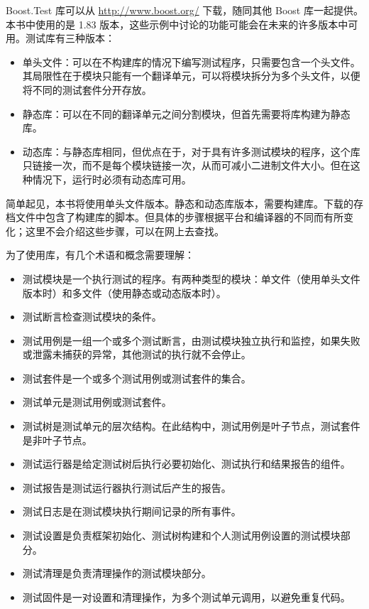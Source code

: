 
Boost.Test 库可以从 \url{http://www.boost.org/} 下载，随同其他 Boost 库一起提供。本书中使用的是 1.83 版本，这些示例中讨论的功能可能会在未来的许多版本中可用。测试库有三种版本：

\begin{itemize}
\item
单头文件：可以在不构建库的情况下编写测试程序，只需要包含一个头文件。其局限性在于模块只能有一个翻译单元，可以将模块拆分为多个头文件，以便将不同的测试套件分开存放。

\item
静态库：可以在不同的翻译单元之间分割模块，但首先需要将库构建为静态库。

\item
动态库：与静态库相同，但优点在于，对于具有许多测试模块的程序，这个库只链接一次，而不是每个模块链接一次，从而可减小二进制文件大小。但在这种情况下，运行时必须有动态库可用。
\end{itemize}

简单起见，本书将使用单头文件版本。静态和动态库版本，需要构建库。下载的存档文件中包含了构建库的脚本。但具体的步骤根据平台和编译器的不同而有所变化；这里不会介绍这些步骤，可以在网上去查找。

为了使用库，有几个术语和概念需要理解：

\begin{itemize}
\item
测试模块是一个执行测试的程序。有两种类型的模块：单文件（使用单头文件版本时）和多文件（使用静态或动态版本时）。

\item
测试断言检查测试模块的条件。

\item
测试用例是一组一个或多个测试断言，由测试模块独立执行和监控，如果失败或泄露未捕获的异常，其他测试的执行就不会停止。

\item
测试套件是一个或多个测试用例或测试套件的集合。

\item
测试单元是测试用例或测试套件。

\item
测试树是测试单元的层次结构。在此结构中，测试用例是叶子节点，测试套件是非叶子节点。

\item
测试运行器是给定测试树后执行必要初始化、测试执行和结果报告的组件。

\item
测试报告是测试运行器执行测试后产生的报告。

\item
测试日志是在测试模块执行期间记录的所有事件。

\item
测试设置是负责框架初始化、测试树构建和个人测试用例设置的测试模块部分。

\item
测试清理是负责清理操作的测试模块部分。

\item
测试固件是一对设置和清理操作，为多个测试单元调用，以避免重复代码。
\end{itemize}

